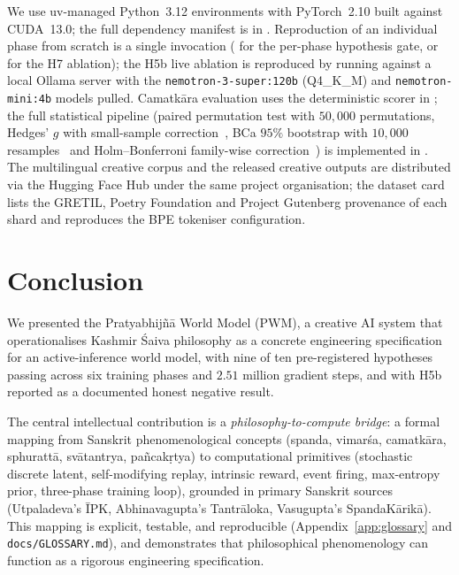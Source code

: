 \documentclass[journal,onecolumn,11pt]{IEEEtran}
\begin{document}
We use uv-managed Python~3.12 environments with PyTorch~2.10 built against
CUDA~13.0; the full dependency manifest is in .
Reproduction of an individual phase from scratch is a single invocation
( for the per-phase hypothesis gate, or
 for the H7 ablation); the H5b live
ablation is reproduced by running  against a
local Ollama server with the \texttt{nemotron-3-super:120b} (Q4\_K\_M) and
\texttt{nemotron-mini:4b} models pulled.
Camatkāra evaluation uses the deterministic 
scorer in ; the full statistical pipeline
(paired permutation test with $50{,}000$ permutations, Hedges' $g$ with
small-sample correction~\cite{hedges1981distribution}, BCa $95\%$ bootstrap
with $10{,}000$ resamples~\cite{efron1987bootstrap} and Holm--Bonferroni
family-wise correction~\cite{holm1979simple}) is implemented in
.
The multilingual creative corpus and the released creative outputs are
distributed via the Hugging Face Hub under the same project organisation;
the dataset card lists the GRETIL, Poetry Foundation and Project Gutenberg
provenance of each shard and reproduces the BPE tokeniser configuration.

\section{Conclusion}\label{sec:conclusion}

We presented the Pratyabhijñā World Model (PWM), a creative AI system that
operationalises Kashmir Śaiva philosophy as a concrete engineering
specification for an active-inference world model, with nine of ten
pre-registered hypotheses passing across six training phases and $2.51$
million gradient steps, and with H5b reported as a documented honest
negative result.

The central intellectual contribution is a \emph{philosophy-to-compute bridge}:
a formal mapping from Sanskrit phenomenological concepts (spanda, vimarśa,
camatkāra, sphurattā, svātantrya, pañcakṛtya) to computational primitives
(stochastic discrete latent, self-modifying replay, intrinsic reward, event firing,
max-entropy prior, three-phase training loop), grounded in primary Sanskrit sources
(Utpaladeva's ĪPK, Abhinavagupta's Tantrāloka, Vasugupta's SpandaKārikā).
This mapping is explicit, testable, and reproducible (Appendix~\ref{app:glossary}
and \texttt{docs/GLOSSARY.md}), and demonstrates that philosophical phenomenology
can function as a rigorous engineering specification.
\end{document}
